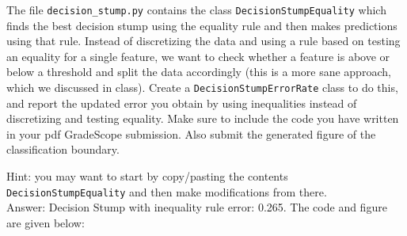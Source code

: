 \documentclass{article}
\def\blu#1{{\color{blu}#1}}
\def\gre#1{{\color{gre}#1}}
\def\ans#1{\gre{Answer: #1}}{}
\begin{document}
The file \texttt{decision\string_stump.py} contains the class \texttt{DecisionStumpEquality} which 
finds the best decision stump using the equality rule and then makes predictions using that
rule. Instead of discretizing the data and using a rule based on testing an equality for 
a single feature, we want to check whether a feature is above or below a threshold and 
split the data accordingly (this is a more sane approach, which we discussed in class). 
\blu{Create a \texttt{DecisionStumpErrorRate} class to do this, and report the updated error you 
obtain by using inequalities instead of discretizing and testing equality. Make sure to include the code you have written in your pdf GradeScope submission. Also submit the generated figure of the classification boundary.}

Hint: you may want to start by copy/pasting the contents \texttt{DecisionStumpEquality} and then make modifications from there.  \\
\ans{Decision Stump with inequality rule error: 0.265. The code  and figure are given below:} \\
\end{document}
